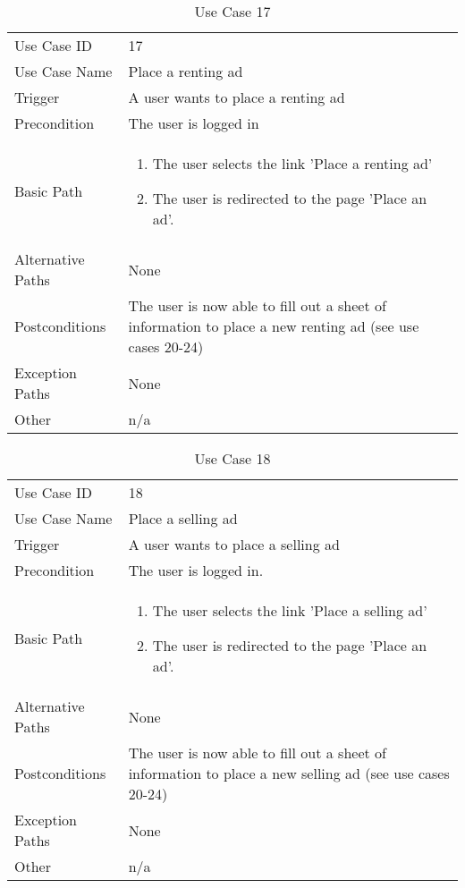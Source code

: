\begin{table}[H]
\centering
\label{table-use-case-17}
\begin{tabular}{|p{3cm}|p{10cm}}
Use Case ID       & 17                                                        \\
Use Case Name     & Place a renting ad                            \\
Trigger           & A user wants to place a renting ad\\
Precondition      & The user is logged in             \\
Basic Path        & \begin{enumerate}
\item The user selects the link 'Place a renting ad'
\item The user is redirected to the page 'Place an ad'. 
\end{enumerate} 
     \\
Alternative Paths & None                          \\
Postconditions    & The user is now able to fill out a sheet of information to
place a new renting ad  (see use cases 20-24)	\\
Exception Paths   & None			\\
Other             & n/a                                                                                                                                                                                                        
\end{tabular}
\caption{Use Case 17}
\end{table}


\begin{table}[H]
\centering
\label{table-use-case-18}
\begin{tabular}{|p{3cm}|p{10cm}}
Use Case ID       & 18                                                      \\
Use Case Name     & Place a selling ad                            \\
Trigger           & A user wants to place a selling ad\\
Precondition      & The user is logged in.             \\
Basic Path        & \begin{enumerate}
\item The user selects the link 'Place a selling ad'
\item The user is redirected to the page 'Place an ad'. 
\end{enumerate} 
     \\
Alternative Paths & None                          \\
Postconditions    & The user is now able to fill out a sheet of information to
place a new selling ad (see use cases 20-24)	\\
Exception Paths   & None			\\
Other             & n/a                                                                                                                                                                                                        
\end{tabular}
\caption{Use Case 18}
\end{table}


